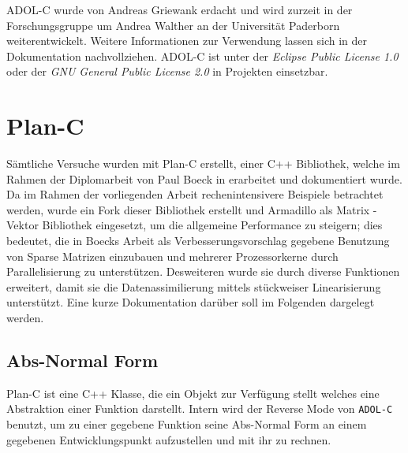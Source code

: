 ADOL-C wurde von Andreas Griewank erdacht und wird zurzeit in der Forschungsgruppe um Andrea Walther an der Universität Paderborn weiterentwickelt. Weitere Informationen zur Verwendung lassen sich in der Dokumentation \cite{walther2012getting} nachvollziehen. ADOL-C ist unter der \textit{Eclipse Public License 1.0} oder der \textit{GNU General Public License 2.0} in Projekten einsetzbar.

\section{Plan-C}
\label{sec:impl:planc}
Sämtliche Versuche wurden mit Plan-C erstellt, einer C++ Bibliothek, welche im Rahmen der Diplomarbeit von Paul Boeck in \cite{boeck14} erarbeitet und dokumentiert wurde. Da im Rahmen der vorliegenden Arbeit rechenintensivere Beispiele betrachtet werden, wurde ein Fork dieser Bibliothek erstellt und Armadillo als Matrix - Vektor Bibliothek eingesetzt, um die allgemeine Performance zu steigern; dies bedeutet, die in Boecks Arbeit als Verbesserungsvorschlag gegebene Benutzung von Sparse Matrizen einzubauen und mehrerer Prozessorkerne durch Parallelisierung zu unterstützen.  Desweiteren wurde sie durch diverse Funktionen erweitert, damit sie die Datenassimilierung mittels stückweiser Linearisierung unterstützt. Eine kurze Dokumentation darüber soll im Folgenden dargelegt werden.

\subsection{Abs-Normal Form}
Plan-C ist eine C++ Klasse, die ein Objekt zur Verfügung stellt welches eine Abstraktion einer Funktion darstellt. Intern wird der Reverse Mode von \texttt{ADOL-C} benutzt, um zu einer gegebene Funktion seine Abs-Normal Form an einem gegebenen Entwicklungspunkt aufzustellen und mit ihr zu rechnen.

